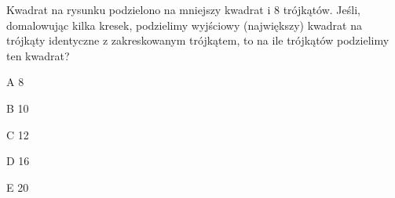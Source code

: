 \begin{tresc}
Kwadrat na rysunku podzielono na mniejszy kwadrat i 8 trójkątów. Jeśli, domalowując kilka kresek, podzielimy wyjściowy (największy) kwadrat na trójkąty identyczne z zakreskowanym trójkątem, to na ile trójkątów podzielimy ten kwadrat?
\end{tresc}
\begin{wariant}{A} 8 \end{wariant}
\begin{wariant}{B} 10 \end{wariant}
\begin{wariant}{C} 12 \end{wariant}
\begin{wariant}{D} 16 \end{wariant}
\begin{wariant}{E} 20 \end{wariant}
